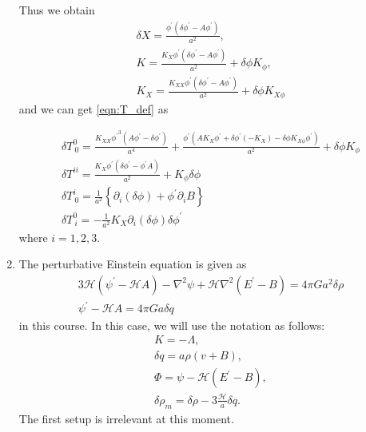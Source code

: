 \documentclass[a4paper,pdftex,10pt]{article}
\begin{document}
\begin{enumerate}
        Thus we obtain
        \begin{gather}
          \delta X
          =
          \frac{\phi^{\prime} (\delta \phi^{\prime}-A \phi^{\prime})}{a^2}
          ,
          \\
          K
          =
          \frac{K_X \phi^{\prime} (\delta \phi^{\prime}-A \phi^{\prime})}{a^2}+\delta \phi  K_{\phi }
          ,
          \\
          K_{X}
          =
          \frac{K_{XX} \phi^{\prime} (\delta \phi^{\prime}-A \phi^{\prime})}{a^2}+\delta \phi  K_{X \phi}
        \end{gather}
        and we can get \eqref{eqn:T_def} as
        \begin{graybox}
          \vspace*{-10pt}
          \begin{gather}
            \delta T^{0}_{\ 0}
            =
            \frac{K_{XX} {\phi^{\prime}}^3 (A {\phi^{\prime}}-{\delta \phi^{\prime}})}{a^4}+\frac{{\phi^{\prime}} (A K_X {\phi^{\prime}}+{\delta \phi^{\prime}} (-K_X)-\delta \phi  K_{X \phi} {\phi^{\prime}})}{a^2}+\delta \phi  K_{\phi }
            \\
            \delta T^{ii}
            =
            \frac{K_{X}\phi^{\prime}(\delta\phi^{\prime}-\phi^{\prime}A)}{a^2}+K_{\phi}\delta\phi
            \\
            \delta T^{i}_{\ 0}
            =
            \frac{1}{a^2}
            \left\{
            \partial_{i}(\delta\phi)+\phi^{\prime}\partial_{i}B
            \right\}
            \\
            \delta T^{0}_{\ i}
            =
            -\frac{1}{a^2}K_{X}\partial_{i}(\delta\phi)\delta\phi^{\prime}
          \end{gather}
          where $i=1,2,3$.
        \end{graybox}

  \item
        The perturbative Einstein equation is given as
        \begin{gather}
          3\mathcal{H}(\psi^{\prime}-\mathcal{H}A)-\nabla^2\psi+\mathcal{H}\nabla^2(E^{\prime}-B)
          =
          4\pi Ga^2\delta\rho
          \label{eqn:hoge_1}
          \\
          \psi^{\prime}-\mathcal{H}A=4\pi Ga\delta q
          \label{eqn:hoge_2}
        \end{gather}
        in this course. In this case, we will use the notation as follows:
        \begin{gather}
          K=-\Lambda
          ,
          \\
          \delta q=a\rho(v+B)
          ,
          \\
          \Phi = \psi-\mathcal{H}(E^{\prime}-B)
          \label{eqn:PHI}
          ,
          \\
          \delta\rho_{m}
          =
          \delta\rho
          -
          3\frac{\mathcal{H}}{a}\delta q
          \label{eqn:deltarhom}
          .
        \end{gather}
        The first setup is irrelevant at this moment.


\end{enumerate}
\end{document}
